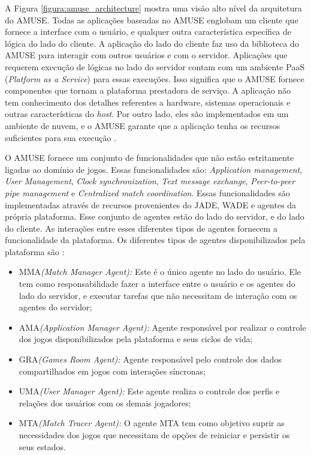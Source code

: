 A Figura \ref{figura:amuse_architecture} mostra uma visão alto nível da
arquitetura do AMUSE. Todas as aplicações baseadas no AMUSE englobam um cliente
que fornece a interface com o usuário, e qualquer outra característica
específica de lógica do lado do cliente. A aplicação do lado do cliente faz uso
da biblioteca do AMUSE para interagir com outros usuários e com o servidor.
Aplicações que requerem execução de lógicas no lado do servidor contam com um
ambiente PaaS (\textit{Platform as a Service}) para essas execuções. Isso
significa que o AMUSE fornece componentes que tornam a plataforma prestadora de
serviço. A aplicação não tem conhecimento dos detalhes referentes a hardware,
sistemas operacionais e outras características do \textit{host}. Por outro
lado, eles são implementados em um ambiente de nuvem, e o AMUSE garante que a
aplicação tenha os recursos suficientes para sua execução
\cite{amuseStartupGuide}.

O AMUSE fornece um conjunto de funcionalidades que não estão estritamente
ligadas ao domínio de jogos. Essas funcionalidades são: \textit{Application
management}, \textit{User Management}, \textit{Clock synchronization},
\textit{Text message exchange}, \textit{Peer-to-peer pipe management} e
\textit{Centralized match coordination}. Essas funcionalidades são
implementadas através de recursos provenientes do JADE, WADE e agentes da
própria plataforma. Esse conjunto de agentes estão do lado do servidor, e do
lado do cliente. As interações entre esses diferentes tipos de agentes fornecem
a funcionalidade da plataforma. Os diferentes tipos de agentes disponibilizados
pela plataforma são \cite{bergenti2015}:

\begin{itemize}
  \item MMA\textit{(Match Manager Agent):} Este é o único agente no lado do usuário. Ele tem como responsabilidade fazer a interface entre o usuário e os agentes do lado do servidor, e executar tarefas que não necessitam de interação com os agentes do servidor;
  \item AMA\textit{(Application Manager Agent):} Agente responsável por realizar o controle dos jogos disponibilizados pela plataforma e seus ciclos de vida;
  \item GRA\textit{(Games Room Agent):} Agente responsável pelo controle dos dados compartilhados em jogos com interações síncronas;
  \item UMA\textit{(User Manager Agent):} Este agente realiza o controle dos perfis e relações dos usuários com os demais jogadores;
  \item MTA\textit{(Match Tracer Agent):} O agente MTA tem como objetivo suprir as necessidades dos jogos que necessitam de opções de reiniciar e persistir os seus estados.
\end{itemize}


